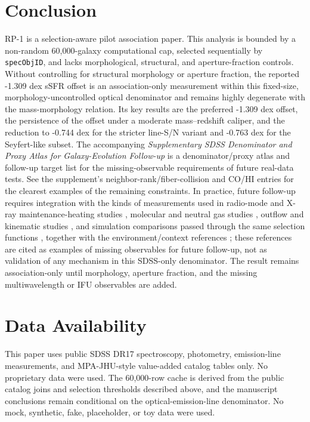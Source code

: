 \documentclass[twocolumn]{aastex631}
\begin{document}
\section{Conclusion}
RP-1 is a selection-aware pilot association paper. This analysis is bounded by a non-random 60,000-galaxy computational cap, selected sequentially by \texttt{specObjID}, and lacks morphological, structural, and aperture-fraction controls. Without controlling for structural morphology or aperture fraction, the reported -1.309 dex sSFR offset is an association-only measurement within this fixed-size, morphology-uncontrolled optical denominator and remains highly degenerate with the mass-morphology relation. Its key results are the preferred -1.309 dex offset, the persistence of the offset under a moderate mass--redshift caliper, and the reduction to -0.744 dex for the stricter line-S/N variant and -0.763 dex for the Seyfert-like subset. The accompanying \emph{Supplementary SDSS Denominator and Proxy Atlas for Galaxy-Evolution Follow-up} is a denominator/proxy atlas and follow-up target list for the missing-observable requirements of future real-data tests. See the supplement's neighbor-rank/fiber-collision and CO/HI entries for the clearest examples of the remaining constraints.
In practice, future follow-up requires integration with the kinds of measurements used in radio-mode and X-ray maintenance-heating studies \citep{best2005,fabian2012,mcnamara2007,heckmanbest2014,lamassa2013}, molecular and neutral gas studies \citep{xcoldgass2017,xgass2018}, outflow and kinematic studies \citep{veilleux2005,cicone2014,carniani2017,fiore2017}, and simulation comparisons passed through the same selection functions \citep{simba2019,tng2019,eagle2015}, together with the environment/context references \citep{peng2010,ellison2011,piotrowska2022,wetzel2013,dekel2006}; these references are cited as examples of missing observables for future follow-up, not as validation of any mechanism in this SDSS-only denominator. The result remains association-only until morphology, aperture fraction, and the missing multiwavelength or IFU observables are added.

\section*{Data Availability}
This paper uses public SDSS DR17 spectroscopy, photometry, emission-line measurements, and MPA-JHU-style value-added catalog tables only. No proprietary data were used. The 60,000-row cache is derived from the public catalog joins and selection thresholds described above, and the manuscript conclusions remain conditional on the optical-emission-line denominator. No mock, synthetic, fake, placeholder, or toy data were used.
\end{document}
